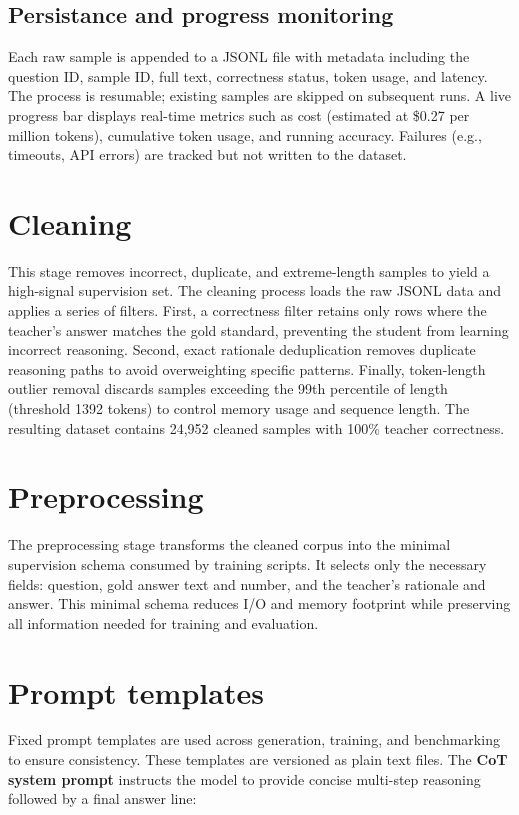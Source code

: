 \subsection{Persistance and progress monitoring}
Each raw sample is appended to a JSONL file with metadata including the question ID, sample ID, full text, correctness status, token usage, and latency. The process is resumable; existing samples are skipped on subsequent runs. A live progress bar displays real-time metrics such as cost (estimated at \$0.27 per million tokens), cumulative token usage, and running accuracy. Failures (e.g., timeouts, API errors) are tracked but not written to the dataset.

\section{Cleaning}
This stage removes incorrect, duplicate, and extreme-length samples to yield a high-signal supervision set. The cleaning process loads the raw JSONL data and applies a series of filters. First, a correctness filter retains only rows where the teacher's answer matches the gold standard, preventing the student from learning incorrect reasoning. Second, exact rationale deduplication removes duplicate reasoning paths to avoid overweighting specific patterns. Finally, token-length outlier removal discards samples exceeding the 99th percentile of length (threshold 1392 tokens) to control memory usage and sequence length. The resulting dataset contains 24{,}952 cleaned samples with 100\% teacher correctness.

\section{Preprocessing}
The preprocessing stage transforms the cleaned corpus into the minimal supervision schema consumed by training scripts. It selects only the necessary fields: question, gold answer text and number, and the teacher's rationale and answer. This minimal schema reduces I/O and memory footprint while preserving all information needed for training and evaluation.

\section{Prompt templates}\label{sec:prompt_templates}
Fixed prompt templates are used across generation, training, and benchmarking to ensure consistency. These templates are versioned as plain text files. The \textbf{CoT system prompt} instructs the model to provide concise multi-step reasoning followed by a final answer line:

